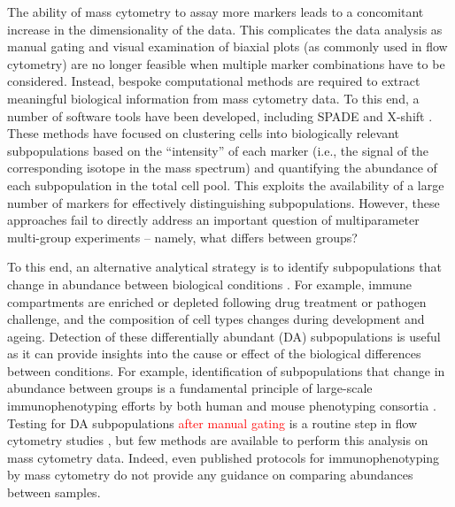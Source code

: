 \documentclass{article}
\newcommand\revised[1]{\textcolor{red}{#1}}
\begin{document}
The ability of mass cytometry to assay more markers leads to a concomitant increase in the dimensionality of the data.
This complicates the data analysis as manual gating and visual examination of biaxial plots (as commonly used in flow cytometry) are no longer feasible when multiple marker combinations have to be considered.
Instead, bespoke computational methods are required to extract meaningful biological information from mass cytometry data. 
To this end, a number of software tools have been developed, including SPADE \cite{qiu2011extracting} and X-shift \cite{samusik2016automated}.
These methods have focused on clustering cells into biologically relevant subpopulations based on the ``intensity'' of each marker (i.e., the signal of the corresponding isotope in the mass spectrum) and quantifying the abundance of each subpopulation in the total cell pool.
This exploits the availability of a large number of markers for effectively distinguishing subpopulations.
However, these approaches fail to directly address an important question of multiparameter multi-group experiments -- namely, what differs between groups?

To this end, an alternative analytical strategy is to identify subpopulations that change in abundance between biological conditions \revised{\cite{gaudilliere2014delayed,gaudilliere2015implementing}}.
For example, immune compartments are enriched or depleted following drug treatment or pathogen challenge, and the composition of cell types changes during development and ageing.
Detection of these differentially abundant (DA) subpopulations is useful as it can provide insights into the cause or effect of the biological differences between conditions.
For example, identification of subpopulations that change in abundance between groups is a fundamental principle of large-scale immunophenotyping efforts by both human and mouse phenotyping consortia \cite{maecker2012standardizing,brown2012international,finak2016standardizing}.
Testing for DA subpopulations \revised{after manual gating} is a routine step in flow cytometry studies \cite{saeys2016computational,mittag2011recent}, but few methods are available to perform this analysis on mass cytometry data.
Indeed, even published protocols for immunophenotyping by mass cytometry \cite{leipold2015multiparameter,leelatian2015characterizing} do not provide any guidance on comparing abundances between samples.
\end{document}
